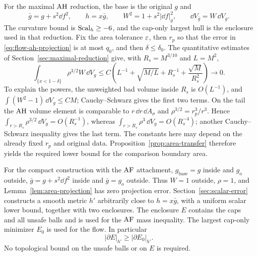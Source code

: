 For the maximal $\mathrm{AH}$ reduction, the base is the original $g$ and
\begin{equation}\label{eq:flow-graph-volume}
 \bar g=g+s^2\dd f^2,\qquad h=x\bar g,\qquad
 W^2=1+s^2|\dd f|_g^2,\qquad
 \dd V_{\bar g}=W\,\dd V_g.
\end{equation}
The curvature bound is $\operatorname{Scal}_h\ge-6$, and the cap-only largest hull
is the enclosure used in that reduction.  Fix the area tolerance
$\varepsilon$, then $r_p$ so that the error in
\eqref{eq:flow-ah-projection} is at most $q_0$, and then
$\delta\le\delta_0$.  The quantitative estimates of
Section~\ref{sec:maximal-reduction} give, with
$R_s=M^{3/10}$ and $L=M^2$,
\begin{equation}\label{eq:flow-ah-bad-volume}
 \int_{\{x<1-\delta\}}\rho^{3/2}W\,\dd V_g
 \le C\left(L^{-1}+\sqrt{M/L}
              +R_s^{-1}+\frac{\sqrt M}{R_s^2}\right)
 \longrightarrow0.
\end{equation}
To explain the powers, the unweighted bad volume inside $R_s$ is
$O(L^{-1})$, and $\int(W^2-1)\,\dd V_g\le CM$; Cauchy--Schwarz
gives the first two terms.  On the tail the $\mathrm{AH}$ volume element is
comparable to $r\,\dd r\,\dd A_\sigma$ and
$\rho^{3/2}=r_p^3/r^3$.  Hence
$\int_{r>R_s}\rho^{3/2}\,\dd V_g=O(R_s^{-1})$, whereas
$\int_{r>R_s}\rho^3\,\dd V_g=O(R_s^{-4})$; another
Cauchy--Schwarz inequality gives the last term.  The constants here
may depend on the already fixed $r_p$ and original data.
Proposition~\ref{prop:area-transfer} therefore yields the required
lower bound for the comparison boundary area.

For the compact construction with the $\mathrm{AF}$ attachment,
$g_{\mathrm{base}}=g$ inside and $g_o$ outside,
$\bar g=g+s^2\dd f^2$ inside and $\bar g=g_o$ outside.  Thus $W=1$
outside, $\rho=1$, and Lemma~\ref{lem:area-projection} has zero
projection error.  Section~\ref{sec:scalar-error} constructs a smooth
metric $h'$ arbitrarily close to $h=x\bar g$, with a uniform scalar
lower bound, together with two enclosures.  The enclosure $E$
contains the caps and all unsafe balls and is used for the
$\mathrm{AF}$ mass inequality.  The largest cap-only minimizer $E_0$ is
used for the flow.  In particular
\begin{equation}\label{eq:flow-af-two-enclosures}
 |\partial E|_{h'}\ge|\partial E_0|_{h'}.
\end{equation}
No topological bound on the unsafe balls or on $E$ is required.

